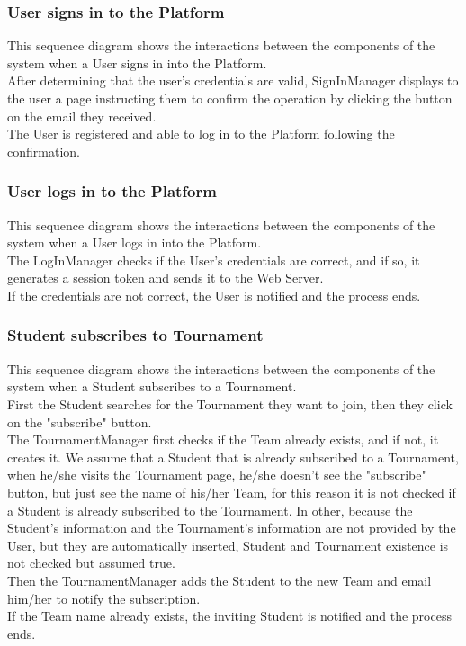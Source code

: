 \begin{landscape}

\clearpage
\subsubsection{User signs in to the Platform}
This sequence diagram shows the interactions between the components of the system when a User signs in into the Platform.\\
After determining that the user's credentials are valid, SignInManager displays to the user a page instructing them to confirm the operation by clicking the button on the email they received.\\
The User is registered and able to log in to the Platform following the confirmation.

\clearpage
\subsubsection{User logs in to the Platform}
This sequence diagram shows the interactions between the components of the system when a User logs in into the Platform.\\
The LogInManager checks if the User's credentials are correct, and if so, it generates a session token and sends it to the Web Server.\\
If the credentials are not correct, the User is notified and the process ends.

\clearpage
\subsubsection{Student subscribes to Tournament}
This sequence diagram shows the interactions between the components of the system when a Student subscribes to a Tournament.\\
First the Student searches for the Tournament they want to join, then they click on the "subscribe" button.\\
The TournamentManager first checks if the Team already exists, and if not, it creates it. We assume that a Student that is already subscribed to a Tournament, when he/she visits the Tournament page, he/she doesn't see the "subscribe" 
button, but just see the name of his/her Team, for this reason it is not checked if a Student is already subscribed to the Tournament. In other, because the Student's information and the Tournament's information are not provided by the 
User, but they are automatically inserted, Student and Tournament existence is not checked but assumed true.\\
Then the TournamentManager adds the Student to the new Team and email him/her to notify the subscription.\\
If the Team name already exists, the inviting Student is notified and the process ends.\\


\end{landscape}
